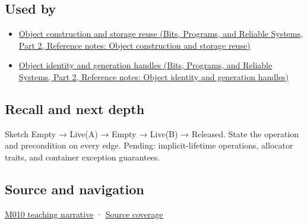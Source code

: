 \subsection{Used by}\label{appendix-f56c3e43fd4e-used-by}

\hypertarget{appendix-f56c3e43fd4e-used-by}{}

\begin{itemize}
\tightlist
\item
  \href{../01-Bits-Programs-and-Reliable-Systems-P02/main.pdf\#nameddest=appendix-a82f9c438857}{Object construction and storage reuse (Bits, Programs, and Reliable Systems, Part 2, Reference notes: Object construction and storage reuse)}
\item
  \href{../01-Bits-Programs-and-Reliable-Systems-P02/main.pdf\#nameddest=appendix-f1581457d322}{Object identity and generation handles (Bits, Programs, and Reliable Systems, Part 2, Reference notes: Object identity and generation handles)}
\end{itemize}

\subsection{Recall and next depth}\label{appendix-f56c3e43fd4e-recall-and-next-depth}

\hypertarget{appendix-f56c3e43fd4e-recall-and-next-depth}{}

Sketch Empty → Live(A) → Empty → Live(B) → Released. State the operation and precondition on every edge. Pending: implicit-lifetime operations, allocator traits, and container exception guarantees.

\subsection{Source and navigation}\label{appendix-f56c3e43fd4e-source-and-navigation}

\hypertarget{appendix-f56c3e43fd4e-source-and-navigation}{}

\hyperref[01-foundations-i-ch004-placement-construction-reuses-storage-it-does-not-allocate-it]{M010 teaching narrative} · \hyperref[appendix-fd090d982a15-m010---parts-148-160]{Source coverage}
